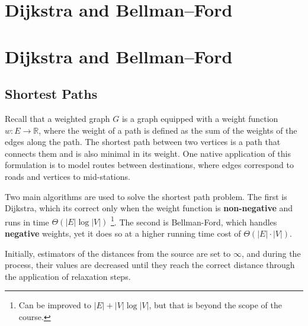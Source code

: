 



\ifdefined\BOOK
\chapter{Dijkstra and Bellman–Ford} 
\else
\setcounter{chapter}{5}
\chapter*{Dijkstra and Bellman–Ford} 
\thispagestyle{firststyle}
\fi


\section{Shortest Paths} 

Recall that a weighted graph $G$ is a graph equipped with a weight function $w : E \rightarrow \mathbb{R}$, where the weight of a path is defined as the sum of the weights of the edges along the path. The shortest path between two vertices is a path that connects them and is also minimal in its weight. One native application of this formulation is to model routes between destinations, where edges correspond to roads and vertices to mid-stations.

Two main algorithms are used to solve the shortest path problem. The first is Dijkstra, which its correct only when the weight function is \textbf{non-negative} and runs in time $\Theta(|E| \log |V|)$ \footnote{Can be improved to $|E| + |V|\log|V|$, but that is beyond the scope of the course.}. The second is Bellman-Ford, which handles \textbf{negative} weights, yet it does so at a higher running time cost of $\Theta(|E| \cdot |V|)$.


Initially, estimators of the distances from the source are set to $\infty$, and during the process, their values are decreased until they reach the correct distance through the application of relaxation steps.



